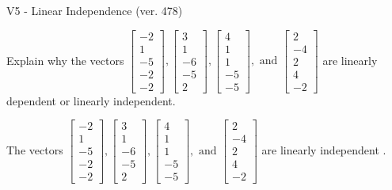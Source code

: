 \begin{exercise}
  \begin{exerciseTitle}V5 - Linear Independence (ver. 478)\end{exerciseTitle}
  \begin{exerciseStatement}
    Explain why the vectors \(\left[\begin{array}{r}
-2 \\
1 \\
-5 \\
-2 \\
-2
\end{array}\right] , \left[\begin{array}{r}
3 \\
1 \\
-6 \\
-5 \\
2
\end{array}\right] , \left[\begin{array}{r}
4 \\
1 \\
1 \\
-5 \\
-5
\end{array}\right] , \text{ and } \left[\begin{array}{r}
2 \\
-4 \\
2 \\
4 \\
-2
\end{array}\right]\) are linearly dependent or linearly independent.	


  \end{exerciseStatement}
  \begin{exerciseAnswer}
   The vectors \(\left[\begin{array}{r}
-2 \\
1 \\
-5 \\
-2 \\
-2
\end{array}\right] , \left[\begin{array}{r}
3 \\
1 \\
-6 \\
-5 \\
2
\end{array}\right] , \left[\begin{array}{r}
4 \\
1 \\
1 \\
-5 \\
-5
\end{array}\right] , \text{ and } \left[\begin{array}{r}
2 \\
-4 \\
2 \\
4 \\
-2
\end{array}\right]\) are 
  	 linearly independent  .
  


  \end{exerciseAnswer}
\end{exercise}